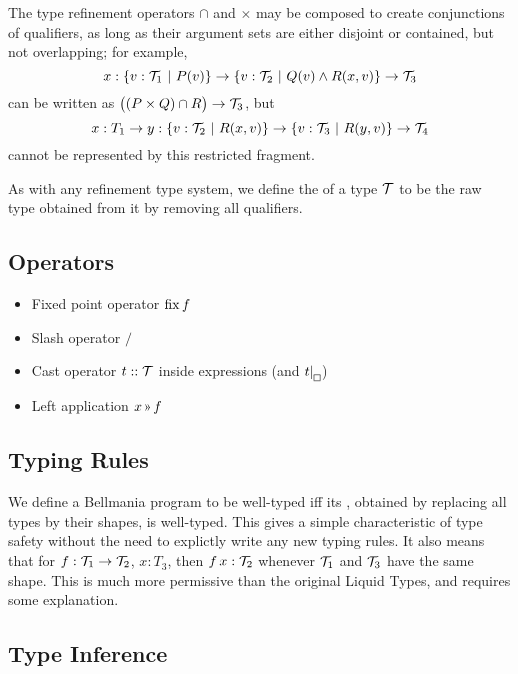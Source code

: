 The type refinement operators $\cap$ and $\times$ may be composed to create conjunctions of qualifiers,
as long as their argument sets are either disjoint or contained, but not overlapping;
for example, \[x:\{v:\mathcal{T}_1~|~P(v)\}\to \{v:\mathcal{T}_2~|~Q(v)\land R(x,v)\}\to\mathcal{T}_3\] can be written as
$\big((P\times Q)\cap R\big)\to\mathcal{T}_3$, but \[x:T_1\to y:\{v:\mathcal{T}_2~|~R(x,v)\} \to \{v:\mathcal{T}_3~|~R(y,v)\}\to\mathcal{T}_4\]
cannot be represented by this restricted fragment.

As with any refinement type system, we define the  of a type $\mathcal{T}$ to be the raw type
obtained from it by removing all qualifiers.

\subsection{Operators}

\newcommand\applt{\textrm{{\scriptsize\,}\guillemotright{\scriptsize\,}}}

{\color{Gray}
\begin{itemize}
  \item Fixed point operator $\operatorname{fix} f$
  \item Slash operator $/$
  \item Cast operator $t :: \mathcal{T}$ inside expressions (and $t|_{\setlength{\fboxsep}{2pt}\fbox{}}$)
  \item Left application $x \applt f$
\end{itemize}
}

\subsection{Typing Rules}

We define a Bellmania program to be well-typed iff its , obtained by replacing all types by
their shapes, is well-typed. This gives a simple characteristic of type safety without the need to
explictly write any new typing rules. It also means that for $f:\mathcal{T}_1\to\mathcal{T}_2$, $x:T_3$, then $f\,x:\mathcal{T}_2$ whenever
$\mathcal{T}_1$ and $\mathcal{T}_3$ have the same shape. This is much more permissive than the original Liquid Types,
and requires some explanation.

\subsection{Type Inference}

